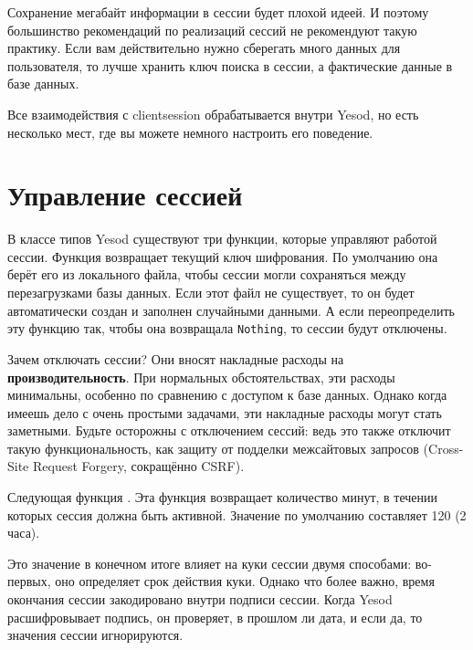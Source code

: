 Сохранение мегабайт информации в сессии будет плохой идеей. И поэтому
большинство рекомендаций по реализаций сессий не рекомендуют такую практику.
Если вам действительно нужно сберегать много данных для пользователя, то лучше
хранить ключ поиска в сессии, а фактические данные в базе данных.

Все взаимодействия с clientsession обрабатывается внутри Yesod, но есть
несколько мест, где вы можете немного настроить его поведение.

\section{Управление сессией}

В классе типов Yesod существуют три функции, которые управляют работой сессии.
Функция
возвращает текущий ключ шифрования. По умолчанию она берёт его из локального
файла, чтобы сессии могли сохраняться между перезагрузками базы данных. Если
этот файл не существует, то он будет автоматически создан и заполнен случайными
данными. А если переопределить эту функцию так, чтобы она возвращала
\lstinline'Nothing', то сессии будут отключены.

\begin{remark}
    Зачем отключать сессии? Они вносят накладные расходы на
    \textbf{производительность}. При нормальных обстоятельствах, эти расходы
    минимальны, особенно по сравнению с доступом к базе данных. Однако когда
    имеешь дело с очень простыми задачами, эти накладные расходы могут стать
    заметными. Будьте осторожны с отключением сессий: ведь это также отключит
    такую функциональность, как защиту от подделки межсайтовых запросов
    (Cross-Site Request Forgery, сокращённо CSRF).
\end{remark}

Следующая функция
.
Эта функция возвращает количество минут, в течении которых сессия должна быть
активной. Значение по умолчанию составляет 120 (2 часа).

Это значение в конечном итоге влияет на куки сессии двумя способами: во-первых,
оно определяет срок действия куки. Однако что более важно, время окончания
сессии закодировано внутри подписи сессии. Когда Yesod расшифровывает подпись,
он проверяет, в прошлом ли дата, и если да, то значения сессии игнорируются.

